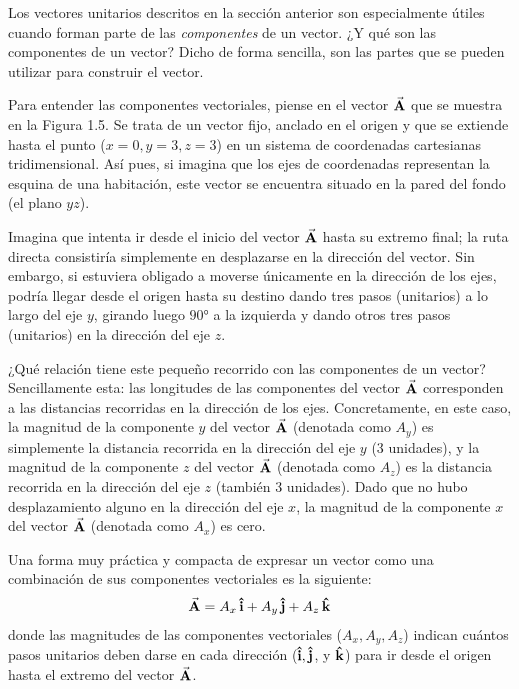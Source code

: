 \documentclass[hidelinks,12pt]{article}
\begin{document}
Los vectores unitarios descritos en la sección anterior son especialmente útiles cuando forman parte de las \textit{componentes} de un vector. ¿Y qué son las componentes de un vector? Dicho de forma sencilla, son las partes que se pueden utilizar para construir el vector.
\par
Para entender las componentes vectoriales, piense en el vector $\va{A}$ que se muestra en la Figura 1.5. Se trata de un vector fijo, anclado en el origen y que se extiende hasta el punto ($x = 0, y = 3, z = 3$) en un sistema de coordenadas cartesianas tridimensional. Así pues, si imagina que los ejes de coordenadas representan la esquina de una habitación, este vector se encuentra situado en la pared del fondo (el plano $yz$).
\par
Imagina que intenta ir desde el inicio del vector $\va{A}$ hasta su extremo final; la ruta directa consistiría simplemente en desplazarse en la dirección del vector. Sin embargo, si estuviera obligado a moverse únicamente en la dirección de los ejes, podría llegar desde el origen hasta su destino dando tres pasos (unitarios) a lo largo del eje $y$, girando luego $\ang{90}$ a la izquierda y dando otros tres pasos (unitarios) en la dirección del eje $z$.
\par
¿Qué relación tiene este pequeño recorrido con las componentes de un vector? Sencillamente esta: las longitudes de las componentes del vector $\va{A}$ corresponden a las distancias recorridas en la dirección de los ejes. Concretamente, en este caso, la magnitud de la componente $y$ del vector $\va{A}$ (denotada como $A_{y}$) es simplemente la distancia recorrida en la dirección del eje $y$ (3 unidades), y la magnitud de la componente $z$ del vector $\va{A}$ (denotada como $A_{z}$) es la distancia recorrida en la dirección del eje $z$ (también 3 unidades). Dado que no hubo desplazamiento alguno en la dirección del eje $x$, la magnitud de la componente $x$ del vector $\va{A}$ (denotada como $A_{x}$) es cero.
\par
Una forma muy práctica y compacta de expresar un vector como una combinación de sus componentes vectoriales es la siguiente:
\begin{align}
	\va{A} = A_{x} \, \vu{i} + A_{y} \, \vu{j} + A_{z} \, \vu{k}
	\label{eq:ecuacion_01_01}
\end{align}
donde las magnitudes de las componentes vectoriales ($A_{x}, A_{y}, A_{z}$) indican cuántos pasos unitarios deben darse en cada dirección ($\vu{i}, \vu{j}$, y $\vu{k}$) para ir desde el origen hasta el extremo del vector $\va{A}$.
\end{document}

